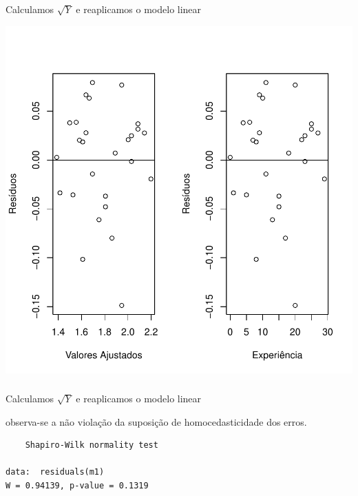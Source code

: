 \documentclass[14pt,aspectratio=1610]{beamer}
\begin{document}
\begin{frame}[fragile]{}
\frametitle{ }
\begin{block}{Calculamos $\sqrt{Y}$ e reaplicamos o modelo linear}
\vspace{-0.5cm}
\end{block}
\begin{center}
\includegraphics{Aula4Regressao/Figuras/Aula4-024}
\end{center}
\end{frame}
% 
\begin{frame}[fragile]{}
\frametitle{ }
\begin{block}{Calculamos $\sqrt{Y}$ e reaplicamos o modelo linear}

observa-se a não violação da suposição de homocedasticidade dos erros.

\begin{center}
\begin{verbatim}
	Shapiro-Wilk normality test

data:  residuals(m1)
W = 0.94139, p-value = 0.1319    
\end{verbatim}
\end{center}
\end{block}
\end{frame}
\end{document}
